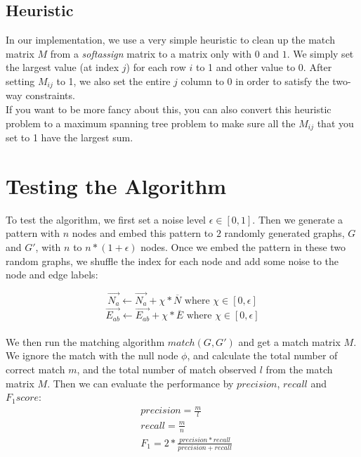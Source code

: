 \subsection{Heuristic}

In our implementation, we use a very simple heuristic to clean up the match matrix $M$ from a \emph{softassign} matrix to a matrix only with $0$ and $1$. We simply set the largest value (at index $j$) for each row $i$ to 1 and other value to 0. After setting $M_{ij}$ to 1, we also set the entire $j$ column to 0 in order to satisfy the two-way constraints.\\

If you want to be more fancy about this, you can also convert this heuristic problem to a maximum spanning tree problem to make sure all the $M_{ij}$ that you set to 1 have the largest sum.

\newpage

\section{Testing the Algorithm}

To test the algorithm, we first set a noise level $\epsilon \in [0,1]$. Then we generate a pattern with $n$ nodes and embed this pattern to $2$ randomly generated graphs, $G$ and $G'$, with $n$ to $n*(1+\epsilon)$ nodes. Once we embed the pattern in these two random graphs, we shuffle the index for each node and add some noise to the node and edge labels:

\begin{equation} 
\overrightarrow{N_{a}} \leftarrow \overrightarrow{N_{a}}  + \chi*\overline{N} \text{ where } \chi \in [0,\epsilon]
\end{equation}
\begin{equation} 
\overrightarrow{E_{ab}} \leftarrow \overrightarrow{E_{ab}}  + \chi*\overline{E} \text{ where } \chi \in [0,\epsilon]
\end{equation}\\

We then run the matching algorithm $match(G,G')$ and get a match matrix $M$. We ignore the match with the null node $\phi$, and calculate the total number of correct match $m$, and the total number of match observed $l$ from the match matrix $M$. Then we can evaluate the performance by $precision$, $recall$ and $F_1 score$:
\begin{align} 
& precision = \frac{m}{l}\\
& recall = \frac{m}{n}\\
& F_1 =2*\frac{precision*recall}{precision+recall}
\end{align}

